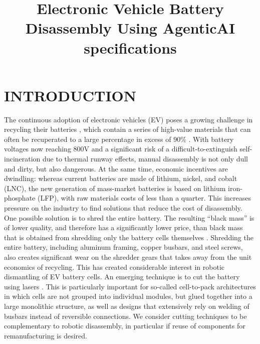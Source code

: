 \documentclass[letterpaper, 10 pt, conference]{ieeeconf}  %
\title{\LARGE \bf
Electronic Vehicle Battery Disassembly Using AgenticAI specifications
}
\begin{document}
\maketitle
\thispagestyle{empty}
\pagestyle{empty}


\begin{abstract}

\end{abstract}


\section{INTRODUCTION}
The continuous adoption of electronic vehicles (EV) poses a growing challenge in recycling their batteries \cite{beaudet2020key}, which contain a series of high-value materials that can often be recuperated to a large percentage in excess of 90\% \cite{ali2025sustainable}. With battery voltages now reaching 800V and a significant risk of a difficult-to-extinguish self-incineration due to thermal runway effects, manual disassembly is not only dull and dirty, but also dangerous. At the same time, economic incentives are dwindling: whereas current batteries are made of lithium, nickel, and cobalt (LNC), the new generation of mass-market batteries is based on lithium iron-phosphate (LFP), with raw materials costs of less than a quarter. This increases pressure on the industry to find solutions that reduce the cost of disassembly. One possible solution is to shred the entire battery. The resulting ``black mass'' is of lower quality, and therefore has a significantly lower price, than black mass that is obtained from shredding only the battery cells themselves \cite{choux2024shred}. Shredding the entire battery, including aluminum framing, copper busbars, and steel screws, also creates significant wear on the shredder gears that takes away from the unit economics of recycling. 
This has created considerable interest in robotic dismantling of EV battery cells.
An emerging technique is to cut the battery using lasers \cite{rettenmeier2024laser}. This is particularly important for so-called cell-to-pack architectures in which cells are not grouped into individual modules, but glued together into a large monolithic structure, as well as designs that extensively rely on welding of busbars instead of reversible connections. We consider cutting techniques to be complementary to robotic disassembly, in particular if reuse of components for remanufacturing is desired. 
\end{document}
